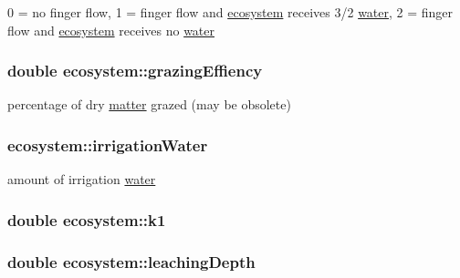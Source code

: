 0 = no finger flow, 1 = finger flow and \hyperlink{classecosystem}{ecosystem} receives 3/2 \hyperlink{classwater}{water}, 2 = finger flow and \hyperlink{classecosystem}{ecosystem} receives no \hyperlink{classwater}{water} \hypertarget{classecosystem_a57fe8b0f42a7b0aa153ff9a628d2fae2}{
\subsubsection[{grazingEffiency}]{\setlength{\rightskip}{0pt plus 5cm}double {\bf ecosystem::grazingEffiency}}}
\label{classecosystem_a57fe8b0f42a7b0aa153ff9a628d2fae2}


percentage of dry \hyperlink{classmatter}{matter} grazed (may be obsolete) \hypertarget{classecosystem_a887cf0ec7ec752882a3ee9d59d814d72}{
\subsubsection[{irrigationWater}]{ {\bf ecosystem::irrigationWater}}}
\label{classecosystem_a887cf0ec7ec752882a3ee9d59d814d72}


amount of irrigation \hyperlink{classwater}{water} \hypertarget{classecosystem_a3e9deac833c64aa8764e5bbcf0e96a99}{
\subsubsection[{k1}]{\setlength{\rightskip}{0pt plus 5cm}double {\bf ecosystem::k1}}}
\label{classecosystem_a3e9deac833c64aa8764e5bbcf0e96a99}
\hypertarget{classecosystem_a1fe02670ff76be100568aa00aeb123c4}{
\subsubsection[{leachingDepth}]{\setlength{\rightskip}{0pt plus 5cm}double {\bf ecosystem::leachingDepth}}}
\label{classecosystem_a1fe02670ff76be100568aa00aeb123c4}


